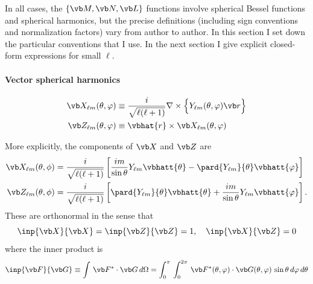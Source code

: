 \documentclass[letterpaper]{article}
\newcommand{\lm}{_{\ell m}}
\begin{document}
In all cases, the $\{\vb M, \vb N, \vb L\}$
functions involve spherical Bessel functions and
spherical harmonics, but the precise definitions (including
sign conventions and normalization factors) vary from author
to author. In this section I set down the particular
conventions that I use. In the next section I give
explicit closed-form expressions for small $\ell$.

\paragraph{Vector spherical harmonics}
\begin{align*}
  \vb X\lm(\theta, \varphi) 
&\equiv \frac{i}{\sqrt{\ell(\ell+1)}}\nabla \times 
     \Big\{Y\lm(\theta, \varphi) \vb r\Big\}
\\
  \vb Z\lm(\theta, \varphi) &\equiv \vbhat{r} \times \vb X\lm(\theta, \varphi)
\end{align*}

\noindent More explicitly, the components of $\vb X$ and $\vb Z$ are
\begin{align*}
\vb X\lm(\theta, \phi) 
&= 
   \frac{i}{\sqrt{\ell(\ell+1)}}
   \left[  \frac{im}{\sin\theta}Y_{\ell m} \vbhatt{\theta}
           -\pard{Y_{\ell m}}{\theta}\vbhatt{\varphi}
   \right]
\\
\vb Z\lm(\theta, \phi) 
&=
   \frac{i}{\sqrt{\ell(\ell+1)}}
   \left[   \pard{Y_{\ell m}}{\theta}\vbhatt{\theta}
           +\frac{im}{\sin\theta}Y_{\ell m} \vbhatt{\varphi}
   \right].
\end{align*}
These are orthonormal in the sense that 
$$ \inp{\vb X}{\vb X}= \inp{\vb Z}{\vb Z}=1,
   \quad \inp{\vb X}{\vb Z}=0
$$
where the inner product is
$$
   \inp{\vb F}{\vb G}\equiv \int \, \vb F^* \cdot \vb G \, d\Omega
   = \int_0^\pi \, \int_0^{2\pi} \, 
     \vb F^*(\theta,\varphi)\cdot \vb G(\theta, \varphi)\,\sin\theta\,d\varphi\,d\theta
$$
\end{document}
